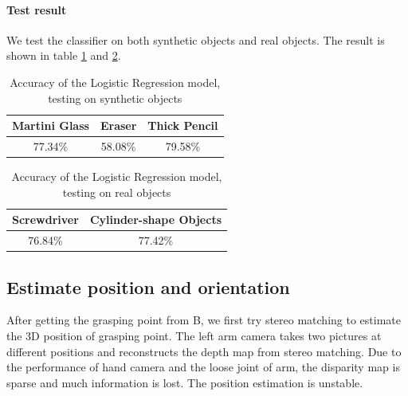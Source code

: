 \documentclass[a4paper, 10pt, conference]{ieeeconf}      %
\begin{document}
\paragraph{Test result}We test the classifier on both synthetic objects and real objects. The result is shown in table \ref{tab:syntheticobject} and \ref{tab:realobject}.
\begin{table}[!htb]
	\centering
	\caption{Accuracy of the Logistic Regression model, testing on synthetic objects}
	\label{tab:syntheticobject}
	\begin{tabular}{c|c|c}
		\hline
		\textbf{Martini Glass} & \textbf{Eraser} & \textbf{Thick Pencil} \\ \hline
		77.34\%                & 58.08\%         & 79.58\%               \\ \hline
	\end{tabular}
\end{table}
\begin{table}[!htb]
	\centering
	\caption{Accuracy of the Logistic Regression model, testing on real objects}
	\label{tab:realobject}
	\begin{tabular}{c|c}
		\hline
		\textbf{Screwdriver} & \textbf{Cylinder-shape Objects} \\ \hline
		76.84\%              & 77.42\%                         \\ \hline
	\end{tabular}
\end{table}






\subsection{Estimate position and orientation}
After getting the grasping point from B, we first try stereo matching to estimate the 3D position of grasping point. The left arm camera takes two pictures at different positions and reconstructs the depth map from stereo matching. Due to the performance of hand camera and the loose joint of arm, the disparity map is sparse and much information is lost. The position estimation is unstable.
\end{document}
